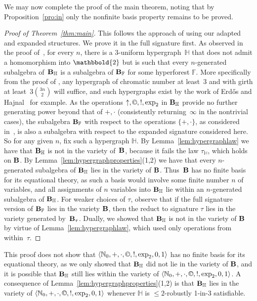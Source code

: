 \documentclass[eqnor,reqno]{amsart}
\theoremstyle{plain}
\theoremstyle{definition}
\newcommand{\cc}{\mathbin{\textup{\copyright}}}
\begin{document}
We may now complete the proof of the main theorem, noting that by Proposition~\ref{pro:in} only the nonfinite basis property remains to be proved.
\begin{proof}[Proof of Theorem~\ref{thm:main}]
This follows the approach of \cite{JRZ} using our adapted and expanded structures.   We prove it in the full signature first.  As observed in the proof of~\cite[Theorem~4.9]{JRZ}, for every $n$, there is a $3$-uniform hypergraph~$\mathbb{H}$ that does not admit a homomorphism into $\mathbbold{2}$ but is such that every $n$-generated subalgebra of~${\bf B}_\mathbb{H}$ is a subalgebra of ${\bf B}_\mathbb{F}$ for some hyperforest $\mathbb{F}$.   More specifically from the proof of \cite[Theorem~4.9]{JRZ}, any hypergraph of chromatic number at least~$3$ and with girth at least~$3\binom{3n}{2}$ will suffice, and such hypergraphs exist by the work of Erd\H{o}s and Hajnal~\cite{erdhaj} for example.  As the operations $\uparrow, \cc,!,\exp_2$ in ${\bf B}_\mathbb{H}$ provide no further generating power beyond that of $+,\cdot$ (consistently returning~$\infty$ in the nontrivial cases), the subalgebra ${\bf B}_\mathbb{F}$ with respect to the operations $\{+,\cdot\}$, as  considered in~\cite{JRZ}, is also a subalgebra with respect to the expanded signature considered here.  So for any given $n$, fix such a hypergraph $\mathbb{H}$.
By Lemma~\ref{lem:hypergraphlaw} we have that ${\bf B}_\mathbb{H}$ is not in the variety of~${\bf B}$, because it fails the law $\tau_\mathbb{H}$, which holds on ${\bf B}$. 
By Lemma~\ref{lem:hypergraphproperties}(1,2) we have that every $n$-generated subalgebra of ${\bf B}_\mathbb{H}$ lies in the variety of ${\bf B}$.  Thus~${\bf B}$ has no finite basis for its equational theory, as such a basis would involve some finite number $n$ of variables, and all assignments of $n$ variables into ${\bf B}_\mathbb{H}$ lie within an $n$-generated subalgebra of ${\bf B}_\mathbb{H}$.  For weaker choices of $\tau$, observe that if the full signature version of ${\bf B}_\mathbb{F}$ lies in the variety ${\bf B}$, then the reduct to signature $\tau$ lies in the variety generated by~${\bf B}_\tau$.  Dually, we showed that ${\bf B}_\mathbb{H}$ is not in the variety of ${\bf B}$ by virtue of Lemma~\ref{lem:hypergraphlaw}, which used only operations from within~$\tau$. 
\end{proof}
This proof does not show that $\langle\mathbb{N}_0,+,\cdot,\cc,!,\exp_2,0,1\rangle$ has no finite basis for its equational theory, as we only showed that ${\bf B}_\mathbb{H}$ did not lie in the variety of ${\bf B}$, and it is possible that ${\bf B}_\mathbb{H}$ still lies within the variety of $\langle\mathbb{N}_0,+,\cdot,\cc,!,\exp_2,0,1\rangle$.  A consequence of Lemma~\ref{lem:hypergraphproperties}(1,2) is that ${\bf B}_\mathbb{H}$ lies in the variety of $\langle\mathbb{N}_0,+,\cdot,\cc,!,\exp_2,0,1\rangle$ whenever $\mathbb{H}$ is $\leq 2$-robustly 1-in-3 satisfiable.
\end{document}
